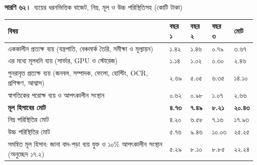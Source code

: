 \documentclass[border=10pt]{standalone}
\begin{document}
\begin{minipage}{17cm}
{\large\bfseries সারণি ৬২।}\ {\large ব্যয়ের ধরনভিত্তিক বাজেট, নিম্ন, মূল ও উচ্চ পরিস্থিতিসহ (কোটি টাকা)}\par\vspace{7pt}
\small
{}
\begin{tabularx}{\linewidth}{@{}>{\hsize=2.530\hsize\raggedright\arraybackslash}X>{\hsize=0.602\hsize\raggedright\arraybackslash}X>{\hsize=0.602\hsize\raggedright\arraybackslash}X>{\hsize=0.602\hsize\raggedright\arraybackslash}X>{\hsize=0.663\hsize\raggedright\arraybackslash}X@{}}
\arrayrulecolor{bapilrule}\toprule
\rowcolor{white}\textbf{বিষয়} & \textbf{বছর ১} & \textbf{বছর ২} & \textbf{বছর ৩} & \textbf{মোট} \\
\midrule
এককালীন প্রত্যক্ষ ব্যয় (যন্ত্রপাতি, বেঞ্চমার্ক তৈরি, সমীক্ষা ও মূল্যায়ন) & ১.৪২ & ১.৪৬ & ০.৭৯ & ৩.৬৭ \\
এর মধ্যে মূলধনি ব্যয় (সার্ভার, GPU ও স্টোরেজ) & ১.১৪ & ১.০২ & ০.৩০ & ২.৪৬ \\
পুনরাবৃত্ত প্রত্যক্ষ ব্যয় (জনবল, সম্পাদক, ফেলো, হোস্টিং, OCR, প্রশিক্ষণ, আশ্বাস) & ২.৬৯ & ৫.০৫ & ৬.৩৫ & ১৪.১০ \\
স্বাগতিকের পরোক্ষ ব্যয় ও আপৎকালীন সংস্থান & ০.৬২ & ০.৯৮ & ১.০৭ & ২.৬৬ \\
\textbf{মূল হিসাবের মোট} & \textbf{৪.৭৩} & \textbf{৭.৪৯} & \textbf{৮.২১} & \textbf{২০.৪৩} \\
নিম্ন পরিস্থিতির মোট & ৪.২০ & ৬.৫৮ & ৭.১৬ & ১৭.৯৩ \\
উচ্চ পরিস্থিতির মোট & ৫.৭৬ & ৯.৪৬ & ১০.০৩ & ২৫.২৫ \\
সমন্বিত মূল হিসাব: জানা বাদ-পড়া ব্যয় যুক্ত ও ১০\% আপৎকালীন সংস্থান (অনুচ্ছেদ ১৭.২) & ৫.২৯ & ৮.১০ & ৮.৮৫ & ২২.২৪ \\
\bottomrule
\end{tabularx}
\par\vspace{5pt}{\footnotesize\itshape নিম্ন পরিস্থিতি: জনবল-ব্যয় ১৫\% কম, মূল্যবৃদ্ধি ৬\%, যন্ত্রপাতি ২০\% সস্তা, প্রতি মার্কিন ডলারে ১২০ টাকা। উচ্চ পরিস্থিতি: জনবল-ব্যয় ২০\% বেশি, মূল্যবৃদ্ধি ১০\%, যন্ত্রপাতি ২৫\% বেশি দামি (যেমন আমদানি শুল্ক ও ভ্যাট), প্রতি মার্কিন ডলারে ১৩৫ টাকা, আপৎকালীন সংস্থান ১০\% এবং পর্যায় ১ অভিযোজনের জন্য ২০,০০০ মার্কিন ডলারের ক্লাউড কম্পিউটিং। সমন্বিত মূল হিসাব: মূল হিসাবের অনুমান, সঙ্গে সম্পৃক্ততা-অনুষ্ঠান, P5-এর জরিপ-তথ্য, ভ্রমণ ও উন্মুক্ত-প্রবেশাধিকার ফির জন্য বছরে ১৫ লাখ টাকা, ১৯ জন নতুন কর্মীর প্রত্যেকের জন্য একটি কম্পিউটার (১,২০০ মার্কিন ডলার) এবং ১০\% আপৎকালীন সংস্থান। প্রতিটি অঙ্ক আলাদাভাবে আসন্নীকৃত।}
\par{}
\end{minipage}
\end{document}
